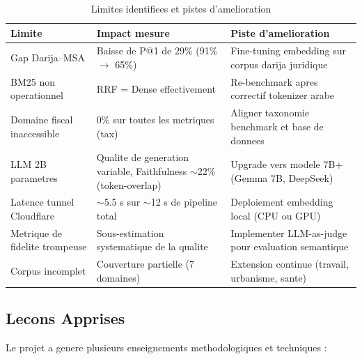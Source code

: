 \begin{table}[h]
\centering
\renewcommand{\arraystretch}{1.3}
\begin{tabular}{|p{3.5cm}|p{4cm}|p{4.5cm}|}
\hline
\rowcolor{LightBlue}
\textbf{\color{PrimaryBlue}Limite} & \textbf{\color{PrimaryBlue}Impact mesure} & \textbf{\color{PrimaryBlue}Piste d'amelioration} \\
\hline
Gap Darija--MSA & Baisse de P@1 de 29\% (91\% $\to$ 65\%) & Fine-tuning embedding sur corpus darija juridique \\
BM25 non operationnel & RRF = Dense effectivement & Re-benchmark apres correctif tokenizer arabe \\
Domaine fiscal inaccessible & 0\% sur toutes les metriques (tax) & Aligner taxonomie benchmark et base de donnees \\
LLM 2B parametres & Qualite de generation variable, Faithfulness $\sim$22\% (token-overlap) & Upgrade vers modele 7B+ (Gemma 7B, DeepSeek) \\
Latence tunnel Cloudflare & $\sim$5.5 s sur $\sim$12 s de pipeline total & Deploiement embedding local (CPU ou GPU) \\
Metrique de fidelite trompeuse & Sous-estimation systematique de la qualite & Implementer LLM-as-judge pour evaluation semantique \\
Corpus incomplet & Couverture partielle (7 domaines) & Extension continue (travail, urbanisme, sante) \\
\hline
\end{tabular}
\caption{Limites identifiees et pistes d'amelioration}
\label{tab:limites}
\end{table}

\subsection{Lecons Apprises}

Le projet a genere plusieurs enseignements methodologiques et techniques :

